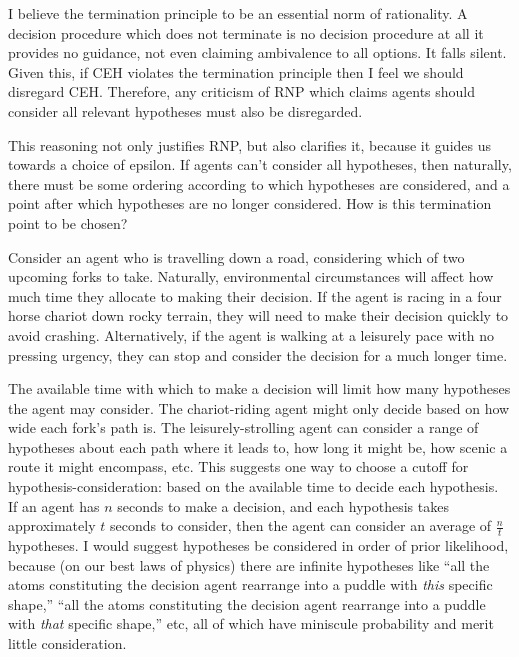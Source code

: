 \documentclass{article}
\begin{document}

I believe the termination principle to be an essential norm of rationality. A decision procedure which does not terminate is no decision procedure at all \textemdash{} it provides no guidance, not even claiming ambivalence to all options. It falls silent. Given this, if CEH violates the termination principle then I feel we should disregard CEH. Therefore, any criticism of RNP which claims agents should consider all relevant hypotheses must also be disregarded. 

This reasoning not only justifies RNP, but also clarifies it, because it guides us towards a choice of epsilon. If agents can't consider all hypotheses, then naturally, there must be some ordering according to which hypotheses are considered, and a point after which hypotheses are no longer considered. How is this termination point to be chosen?

Consider an agent who is travelling down a road, considering which of two upcoming forks to take. Naturally, environmental circumstances will affect how much time they allocate to making their decision. If the agent is racing in a four horse chariot down rocky terrain, they will need to make their decision quickly to avoid crashing. Alternatively, if the agent is walking at a leisurely pace with no pressing urgency, they can stop and consider the decision for a much longer time. 

The available time with which to make a decision will limit how many hypotheses the agent may consider. The chariot-riding agent might only decide based on how wide each fork's path is. The leisurely-strolling agent can consider a range of hypotheses about each path \textemdash{} where it leads to, how long it might be, how scenic a route it might encompass, etc. This suggests one way to choose a cutoff for hypothesis-consideration: based on the available time to decide each hypothesis. If an agent has \(n\) seconds to make a decision, and each hypothesis takes approximately \(t\) seconds to consider, then the agent can consider an average of \(\frac{n}{t}\) hypotheses. I would suggest hypotheses be considered in order of prior likelihood, because (on our best laws of physics) there are infinite hypotheses like ``all the atoms constituting the decision agent rearrange into a puddle with \textit{this} specific shape,'' ``all the atoms constituting the decision agent rearrange into a puddle with \textit{that} specific shape,'' etc, all of which have miniscule probability and merit little consideration. 
\end{document}
